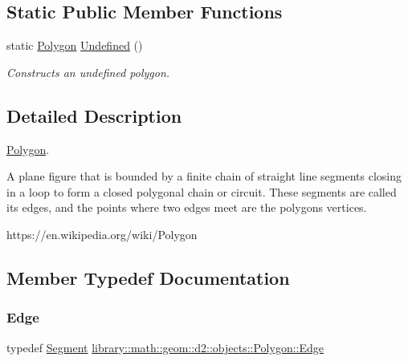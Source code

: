 \subsection*{Static Public Member Functions}
\begin{DoxyCompactItemize}
\item 
static \hyperlink{classlibrary_1_1math_1_1geom_1_1d2_1_1objects_1_1_polygon}{Polygon} \hyperlink{classlibrary_1_1math_1_1geom_1_1d2_1_1objects_1_1_polygon_a86e2c184f51c1e93fce5a786457b9fc3}{Undefined} ()
\begin{DoxyCompactList}\small\item\em Constructs an undefined polygon. \end{DoxyCompactList}\end{DoxyCompactItemize}


\subsection{Detailed Description}
\hyperlink{classlibrary_1_1math_1_1geom_1_1d2_1_1objects_1_1_polygon}{Polygon}. 

A plane figure that is bounded by a finite chain of straight line segments closing in a loop to form a closed polygonal chain or circuit. These segments are called its edges, and the points where two edges meet are the polygon\textquotesingle{}s vertices.

https\+://en.wikipedia.\+org/wiki/\+Polygon 

\subsection{Member Typedef Documentation}
\mbox{\label{classlibrary_1_1math_1_1geom_1_1d2_1_1objects_1_1_polygon_a17e3083d71685e16f3244298e6f44ad9}} 
\subsubsection{\texorpdfstring{Edge}{Edge}}
{\footnotesize\ttfamily typedef \hyperlink{classlibrary_1_1math_1_1geom_1_1d2_1_1objects_1_1_segment}{Segment} \hyperlink{classlibrary_1_1math_1_1geom_1_1d2_1_1objects_1_1_polygon_a17e3083d71685e16f3244298e6f44ad9}{library\+::math\+::geom\+::d2\+::objects\+::\+Polygon\+::\+Edge}}

